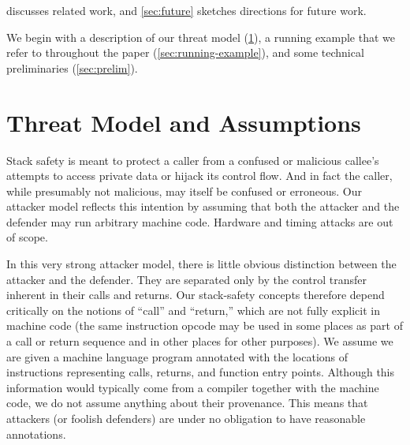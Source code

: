 \documentclass[acmsmall,review,anonymous]{acmart}\settopmatter{printfolios=true,printccs=false,printacmref=false}
\begin{document}
\begin{itemize}
\end{itemize}
 discusses related work, and 
\cref{sec:future} sketches directions for future work.

We begin with a description of our threat model
(\cref{sec:threat}), a running example that we refer to throughout the paper
(\cref{sec:running-example}),  and some technical preliminaries
(\cref{sec:prelim}).

\section{Threat Model and Assumptions}
\label{sec:threat}

Stack safety is meant to protect a caller from a confused or malicious callee's
attempts to access private data or hijack its control flow. And in fact the caller,
while presumably not malicious, may itself be confused or erroneous. Our attacker
model reflects this intention by assuming that both the attacker and the defender
may run arbitrary machine code. Hardware and timing attacks are out of scope.


\newcommand*{\rsp}{\textsc{sp}}

In this very strong attacker model, there is little obvious distinction between
the attacker and the defender. They are separated only by the control transfer
inherent in their calls and returns. Our stack-safety concepts therefore depend
critically on the notions of ``call'' and ``return,'' which are not fully explicit
in machine code (the same instruction opcode may be used in some places as part of
a call or return sequence and in other places for other purposes).
%
We assume we are given a machine language program annotated with the locations of
instructions representing calls, returns, and function entry points. Although this
information would typically come from a compiler together with the machine code,
we do not assume anything about their provenance. This means that attackers (or
foolish defenders) are under no obligation to have reasonable annotations.
\end{document}
